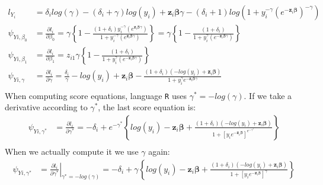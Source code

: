 \documentclass[]{article}
\begin{document}
  $$
  \begin{aligned}
    l_{Y_i} &=    \delta_i log(\gamma)   - (\delta_i + \gamma) log(y_i) +\pmb{z}_i\pmb{\beta}\gamma   - (\delta_i + 1)log\left(1 + y_i^{-\gamma} \left(e^{-\pmb{z}_i\pmb{\beta}} \right)^{-\gamma} \right)\\
    \psi_{Yi,\beta_0} &= \frac{\partial l_i}{\partial \beta_0} =  \gamma \left\{1 - \frac{  (1+\delta_i)y_i^{-\gamma} \left(e^{\pmb{z}_i\pmb{\beta}\gamma}\right)  }{1 +  y_i^{-\gamma} \left(e^{\pmb{z}_i\pmb{\beta}\gamma}\right)}    \right\}   =    \gamma \left\{1 - \frac{  (1+\delta_i)  }{1 +  y_i^{\gamma} \left(e^{-\pmb{z}_i\pmb{\beta}\gamma}\right)}    \right\}\\
    \psi_{Yi,\beta_1} &= \frac{\partial l_i}{\partial \beta_1} =   z_{i1}\gamma \left\{1 - \frac{  (1+\delta_i)  }{1 +  y_i^{\gamma} \left(e^{-\pmb{z}_i\pmb{\beta}\gamma}\right)}    \right\}\\
    \psi_{Yi,\gamma} &= \frac{\partial l_i}{\partial \gamma} =  \frac{\delta_i}{\gamma}  - log(y_i) + \pmb{z}_i\pmb{\beta}  - \frac{  (1+\delta_i)   \left(  -log(y_i) + \pmb{z}_i\pmb{\beta} \right)  }{1 +  y_i^{\gamma} e^{-\pmb{z}_i\pmb{\beta}\gamma}} \\
  \end{aligned}
  $$
When computing score equations, language \texttt{R} uses $\gamma^* = -log(\gamma)$. If we take a derivative according to $\gamma^*$, the last score equation is:
  $$
  \begin{aligned}
    \psi_{Yi,\gamma^*} &= \frac{\partial l_i}{\partial \gamma^*} =  -\delta_i  + e^{-\gamma^*}\left\{log(y_i)  - \pmb{z}_i\pmb{\beta} +  \frac{  (1+\delta_i)\left(  -log(y_i) + \pmb{z}_i\pmb{\beta} \right)  }{1 +  \left[y_i e^{-\pmb{z}_i\pmb{\beta}}\right]^{ e^{-\gamma^*}}    }   \right\}\\
  \end{aligned}
  $$
When we actually compute it we use $\gamma$ again:
  $$
  \begin{aligned}
    \psi_{Yi,\gamma^*} &=\left.  \frac{\partial l_i}{\partial \gamma^*} \right|_{\gamma^* = -log(\gamma)} =  -\delta_i  + \gamma\left\{log(y_i)  - \pmb{z}_i\pmb{\beta} +  \frac{  (1+\delta_i)\left(  -log(y_i) + \pmb{z}_i\pmb{\beta} \right)  }{1 +  \left[y_i e^{-\pmb{z}_i\pmb{\beta}}\right]^{ \gamma}    }   \right\}\\
  \end{aligned}
  $$
\end{document}
